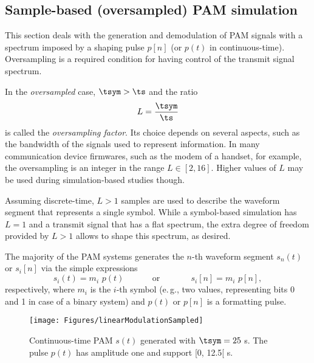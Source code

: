 \subsection{Sample-based (oversampled) PAM simulation}

This section deals with the generation and demodulation of PAM signals with a spectrum imposed by a shaping pulse $p[n]$ (or $p(t)$ in continuous-time). Oversampling is a required condition for having control of the transmit signal spectrum.

In the \emph{oversampled} case, $\tsym > \ts$ and the ratio
\begin{equation}
L = \frac{\tsym}{\ts}
\label{eq:oversampling_factor}
\end{equation}
is called the \emph{oversampling factor}. Its choice depends on several aspects, such as the bandwidth of the signals used to represent information. In many communication device firmwares, such as the modem of a handset, for example, the oversampling is an integer in the range $L \in [2, 16]$. Higher values of $L$ may be used during simulation-based studies though.

Assuming discrete-time, $L>1$ samples are used to describe the waveform segment that represents a single symbol. While a symbol-based simulation has $L=1$ and a transmit signal that has a flat spectrum, the extra degree of freedom provided by $L>1$ allows to shape this spectrum, as desired.

The majority of the PAM systems generates the $n$-th waveform segment $s_n(t)$ or $s_i[n]$ via the simple expressions
\begin{equation}
s_i(t) = m_i \textrm{~} p(t)
\textrm{~~~~~~~~~~or~~~~~~~~~~~}
s_i[n] = m_i \textrm{~} p[n],
\label{eq:onepamsymbol}
\end{equation}
respectively, 
where $m_i$ is the $i$-th symbol (e.\,g., two values, representing bits 0 and 1 in case of a binary system) and $p(t)$ or $p[n]$ is a formatting pulse. 


\begin{figure}[htbp]
\centering
\texttt{[image: Figures/linearModulationSampled]}
\caption[{Continuous-time PAM $s(t)$ generated with $\tsym=25$ s.}]{Continuous-time PAM $s(t)$ generated with $\tsym=25$ s. The pulse $p(t)$ has amplitude one and support [0, 12.5[ s.\label{fig:linearModulationSampled}}
\end{figure}

